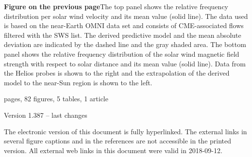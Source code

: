 \newpage

\vspace*{\fill}
\begin{small}
	\noindent \textbf{Figure on the previous page}\quad The top panel shows the relative \Kp{} frequency distribution per solar wind velocity and its mean value (solid line). The data used is based on the near-Earth OMNI data set and consists of CME-associated flows filtered with the SWS list. The derived predictive model and the mean absolute deviation are indicated by the dashed line and the gray shaded area.
	The bottom panel shows the relative frequency distribution of the solar wind magnetic field strength with respect to solar distance and its mean value (solid line). Data from the Helios probes is shown to the right and the extrapolation of the derived model to the near-Sun region is shown to the left.



	
	\vspace{1\baselineskip}
	
	 pages, 82 figures, 5 tables, 1 article

	\noindent Version 1.387 -- last changes \ISOToday{} \thistime{}
	
	\vspace{1\baselineskip}
	
	\noindent The electronic version of this document is fully hyperlinked. The external links in several figure captions and in the references are not accessible in the printed version. All external web links in this document were valid in 2018-09-12.
\end{small}

\normalsize

